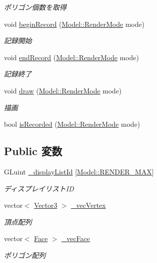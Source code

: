 \begin{DoxyCompactItemize}
\begin{DoxyCompactList}\small\item\em ポリゴン個数を取得 \end{DoxyCompactList}\item 
void \hyperlink{class_model_1_1_object_aa86c244c87f2df29efcb7efb2a03158b}{begin\-Record} (\hyperlink{class_model_a517f749b2393c98904f33fe5134098f6}{Model\-::\-Render\-Mode} mode)
\begin{DoxyCompactList}\small\item\em 記録開始 \end{DoxyCompactList}\item 
void \hyperlink{class_model_1_1_object_a2c5a86ac60e439f9f14e8d472cf413d3}{end\-Record} (\hyperlink{class_model_a517f749b2393c98904f33fe5134098f6}{Model\-::\-Render\-Mode} mode)
\begin{DoxyCompactList}\small\item\em 記録終了 \end{DoxyCompactList}\item 
void \hyperlink{class_model_1_1_object_a783f22baa65124925835580bbc02ea47}{draw} (\hyperlink{class_model_a517f749b2393c98904f33fe5134098f6}{Model\-::\-Render\-Mode} mode)
\begin{DoxyCompactList}\small\item\em 描画 \end{DoxyCompactList}\item 
bool \hyperlink{class_model_1_1_object_a50496a4770f05dd59cf42f3dcb5b0e25}{is\-Recorded} (\hyperlink{class_model_a517f749b2393c98904f33fe5134098f6}{Model\-::\-Render\-Mode} mode)
\end{DoxyCompactItemize}
\subsection*{Public 変数}
\begin{DoxyCompactItemize}
\item 
G\-Luint \hyperlink{class_model_1_1_object_a0e320a887dce26ad4fa9f6d02ccc4185}{\-\_\-display\-List\-Id} \mbox{[}\hyperlink{class_model_a517f749b2393c98904f33fe5134098f6a50c0c96623577e4e8b94a515171e40d7}{Model\-::\-R\-E\-N\-D\-E\-R\-\_\-\-M\-A\-X}\mbox{]}
\begin{DoxyCompactList}\small\item\em ディスプレイリスト\-I\-D \end{DoxyCompactList}\item 
vector$<$ \hyperlink{struct_vector3}{Vector3} $>$ \hyperlink{class_model_1_1_object_a28406f0f699e977339ff38cab8d4dc06}{\-\_\-vec\-Vertex}
\begin{DoxyCompactList}\small\item\em 頂点配列 \end{DoxyCompactList}\item 
vector$<$ \hyperlink{struct_face}{Face} $>$ \hyperlink{class_model_1_1_object_a96a062dc6956ff172c9f0f76851af4b7}{\-\_\-vec\-Face}
\begin{DoxyCompactList}\small\item\em ポリゴン配列 \end{DoxyCompactList}\end{DoxyCompactItemize}


